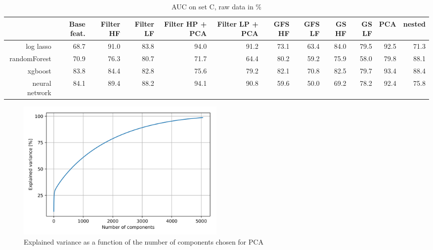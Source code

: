 \documentclass[10pt,conference,compsocconf]{IEEEtran}
\begin{document}
\begin{table}[H]
	\centering
	\begin{tabular}{r|rrrrrrrrrrr}
	\hline
	& Base feat. & Filter HF & Filter LF & Filter HP + PCA & Filter LP + PCA & GFS HF & GFS LF&GS HF &GS LF & PCA & nested \\ \hline
	 log lasso & 68.7 & 91.0 & 83.8 & 94.0 & 91.2 & 73.1 & 63.4 & 84.0 & 79.5 & 92.5 & 71.3 \\
	 randomForest & 70.9 & 76.3 & 80.7 & 71.7 & 64.4 & 80.2 & 59.2 & 75.9 & 58.0 & 79.8 & 88.1 \\
	 xgboost & 83.8 & 84.4 & 82.8 & 75.6 & 79.2 & 82.1 & 70.8 & 82.5 & 79.7 & 93.4 & 88.4 \\
	 neural network & 84.1 & 89.4 & 88.2 & 94.1 & 90.8 & 59.6 & 50.0 & 69.2 & 78.2 & 92.4 & 75.8 \\
	\hline
	\end{tabular}
	\caption{AUC on set C, raw data in \%}
\end{table}

\begin{figure}[H]
	\centering
	\includegraphics[width=0.5\textwidth]{pca_explvar.png}
	\caption{Explained variance as a function of the number of components chosen for PCA}
	\label{fig:explvar}
\end{figure}
	
\end{document}
